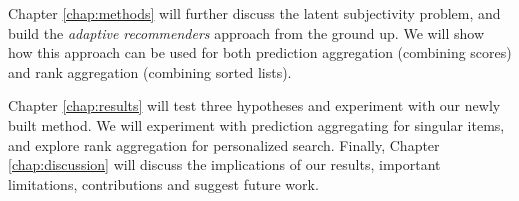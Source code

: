 Chapter \ref{chap:methods} will further discuss the latent subjectivity problem,
and build the \emph{adaptive recommenders} approach from the ground up.
We will show how this approach can be used for both prediction aggregation
(combining scores) and rank aggregation (combining sorted lists).

Chapter \ref{chap:results} will test three hypotheses and experiment with our newly built method.
We will experiment with prediction aggregating for singular items, and explore rank aggregation for personalized search.
Finally, Chapter \ref{chap:discussion} will discuss the implications of our results,
important limitations, contributions and suggest future work.

